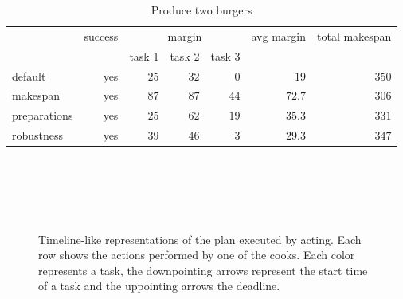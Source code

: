 \begin{table}
  \centering
  \begin{tabular}{lrrrrrr}
                & success & \multicolumn{3}{c}{margin}  & avg margin     & total makespan  \\
                &         &  task 1 & task 2  & task 3  &                &  \\ \hline
  default       & yes     & $25$    & $32$    &  $0$    & $19$           & $350$     \\
  makespan      & yes     & $87$    & $87$    &  $44$   & $72.7$         & $306$       \\
  preparations  & yes     & $25$    & $62$    &  $19$   & $35.3$         & $331$    \\
  robustness    & yes     & $39$    & $46$    &  $3$    & $29.3$         & $347$ \\
  \end{tabular}
  \caption{Produce two burgers}
  \label{tab:eval-acting}
\end{table}



\begin{figure}
  \centering
   \\\medskip
   \\\medskip
   \\\medskip
   \\\medskip
  \caption[]{Timeline-like representations of the plan executed by acting. Each row shows the actions performed by one of the cooks. Each color represents a task, the downpointing arrows represent the start time of a task and the uppointing arrows the deadline.}
  \label{fig:eval-acting}
\end{figure}

